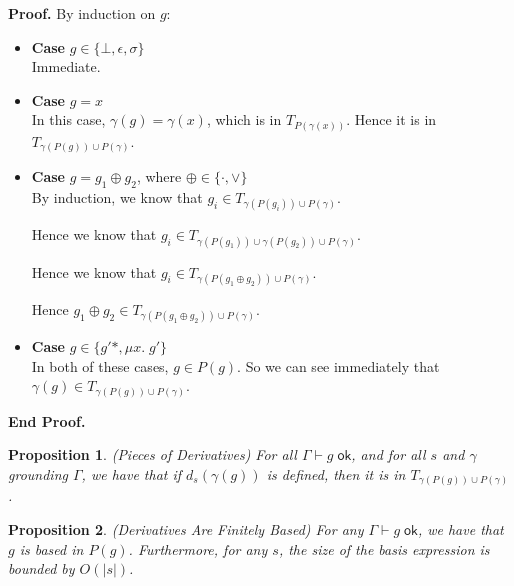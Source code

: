 \documentclass{article}
\newcommand{\fix}[2]{\mu {#1}.\;{#2}}
\newcommand{\judgeok}[2][\Gamma]{{#1} \vdash {#2} \;\mathsf{ok}}
\newcommand{\setof}[1]{\{{#1}\}}
\newcommand{\deriv}[2]{d_{#1}({#2})}
\newcommand{\pieces}[1]{P({#1})}
\newtheorem{prop}{Proposition}
\newenvironment{proof}{\noindent\textbf{Proof.}}{\noindent\textbf{End Proof.}}
\newenvironment{caseblock}{\begin{itemize}}{\end{itemize}}
\newenvironment{case}[1]{\item \textbf{Case} {#1}\\}{}
\begin{document}
\begin{proof}
  By induction on $g$:
  \begin{caseblock}
    \begin{case}{$g \in \setof{\bot, \epsilon, \sigma}$}
      Immediate. 
    \end{case}

    \begin{case}{$g = x$}
      In this case, $\gamma(g) = \gamma(x)$, which is in $T_{\pieces{\gamma(x)}}$. Hence it is 
      in $T_{\gamma(\pieces{g}) \cup \pieces{\gamma}}$. 
    \end{case}

    \begin{case}{$g = g_1 \oplus g_2$, where $\oplus \in \setof{\cdot, \vee}$}
      By induction, we know that $g_i \in T_{\gamma(\pieces{g_i}) \cup \pieces{\gamma}}$. 

      Hence we know that $g_i \in T_{\gamma(\pieces{g_1}) \cup \gamma(\pieces{g_2}) \cup \pieces{\gamma}}$. 

      Hence we know that $g_i \in T_{\gamma(\pieces{g_1 \oplus g_2}) \cup \pieces{\gamma}}$. 

      Hence $g_1 \oplus g_2 \in T_{\gamma(\pieces{g_1 \oplus g_2}) \cup \pieces{\gamma}}$. 
    \end{case}

    \begin{case}{$g \in \setof{g'*, \fix{x}{g'}}$}
      In both of these cases, $g \in \pieces{g}$. So we can see immediately 
      that $\gamma(g) \in T_{\gamma(\pieces{g}) \cup \pieces{\gamma}}$. 
    \end{case}
  \end{caseblock}
\end{proof}

\begin{prop}{(Pieces of Derivatives)}
  For all $\judgeok{g}$, and for all $s$ and $\gamma$ grounding $\Gamma$, we have
  that if $\deriv{s}{\gamma(g)}$ is defined, then it is in $T_{\gamma(\pieces{g}) \cup \pieces{\gamma}}$.
\end{prop}


\begin{prop}{(Derivatives Are Finitely Based)}
  For any $\judgeok{g}$, we have that $g$ is based in $\pieces{g}$. Furthermore, for any
  $s$, the size of the basis expression is bounded by $O(|s|)$. 
\end{prop}
\end{document}

